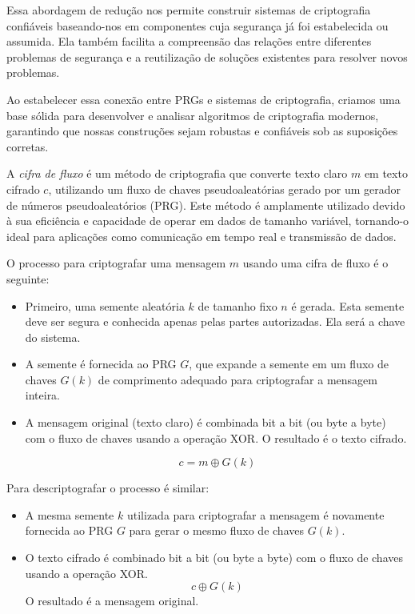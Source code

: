 Essa abordagem de redução nos permite construir sistemas de criptografia confiáveis baseando-nos em componentes cuja segurança já foi estabelecida ou assumida.
Ela também facilita a compreensão das relações entre diferentes problemas de segurança e a reutilização de soluções existentes para resolver novos problemas.

Ao estabelecer essa conexão entre PRGs e sistemas de criptografia, criamos uma base sólida para desenvolver e analisar algoritmos de criptografia modernos, garantindo que nossas construções sejam robustas e confiáveis sob as suposições corretas.

A {\em cifra de fluxo} é um método de criptografia que converte texto claro $m$ em texto cifrado $c$, utilizando um fluxo de chaves pseudoaleatórias gerado por um gerador de números pseudoaleatórios (PRG).
Este método é amplamente utilizado devido à sua eficiência e capacidade de operar em dados de tamanho variável, tornando-o ideal para aplicações como comunicação em tempo real e transmissão de dados.

O processo para criptografar uma mensagem $m$ usando uma cifra de fluxo é o seguinte:
\begin{itemize}
\item Primeiro, uma semente aleatória $k$ de tamanho fixo $n$ é gerada.
  Esta semente deve ser segura e conhecida apenas pelas partes autorizadas.
  Ela será a chave do sistema.
\item A semente é fornecida ao PRG $G$, que expande a semente em um fluxo de chaves $G(k)$ de comprimento adequado para criptografar a mensagem inteira.
\item A mensagem original (texto claro) é combinada bit a bit (ou byte a byte) com o fluxo de chaves usando a operação XOR.
  O resultado é o texto cifrado.

  \begin{displaymath}
    c = m \oplus G(k)
  \end{displaymath}
\end{itemize}

Para descriptografar o processo é similar:
\begin{itemize}
\item A mesma semente $k$ utilizada para criptografar a mensagem é novamente fornecida ao PRG $G$ para gerar o mesmo fluxo de chaves $G(k)$.
\item O texto cifrado é combinado bit a bit (ou byte a byte) com o fluxo de chaves usando a operação XOR.
  \begin{displaymath}
    c \oplus G(k)
  \end{displaymath}
  O resultado é a mensagem original.
\end{itemize}

